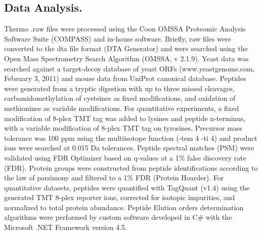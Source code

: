 \subsection*{Data Analysis.}
Thermo .raw files were processed using the Coon OMSSA Proteomic Analysis Software Suite (COMPASS) and in-house software.\cite{compass} Briefly, raw files were converted to the dta file format (DTA Generator) and were searched using the Open Mass Spectrometry Search Algorithm (OMSSA, v 2.1.9).\cite{omssa} Yeast data was searched against a target-decoy database of yeast ORFs (www.yeastgenome.com, February 3, 2011) and mouse data from UniProt canonical database.\cite{targetdecoy} Peptides were generated from a tryptic digestion with up to three missed cleavages, carbamidomethylation of cysteines as fixed modifications, and oxidation of methionines as variable modifications. For quantitative experiments, a fixed modification of 8-plex TMT tag was added to lysines and peptide n-terminus, with a variable modification of 8-plex TMT tag on tyrosines. Precursor mass tolerance was 100 ppm using the multiisotope function (-tem 4 -ti 4) and product ions were searched at 0.015 Da tolerances. Peptide spectral matches (PSM) were validated using FDR Optimizer based on q-values at a 1\% false discovery rate (FDR). Protein groups were constructed from peptide identifications according to the law of parsimony and filtered to a 1\% FDR (Protein Hoarder). For quantitative datasets, peptides were quantified with TagQuant (v1.4) using the generated TMT 8-plex reporter ions, corrected for isotopic impurities, and normalized to total protein abundance. Peptide Elution orders determination algorithms were performed by custom software developed in C\# with the Microsoft .NET Framework version 4.5. 


